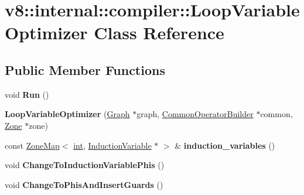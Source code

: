 \hypertarget{classv8_1_1internal_1_1compiler_1_1LoopVariableOptimizer}{}\section{v8\+:\+:internal\+:\+:compiler\+:\+:Loop\+Variable\+Optimizer Class Reference}
\label{classv8_1_1internal_1_1compiler_1_1LoopVariableOptimizer}
\subsection*{Public Member Functions}
\begin{DoxyCompactItemize}
\item 
\mbox{\label{classv8_1_1internal_1_1compiler_1_1LoopVariableOptimizer_acea262e65984d9608955c99a16fed707}} 
void {\bfseries Run} ()
\item 
\mbox{\label{classv8_1_1internal_1_1compiler_1_1LoopVariableOptimizer_a4ff668f7cdafcc1519b5a890decd791b}} 
{\bfseries Loop\+Variable\+Optimizer} (\mbox{\hyperlink{classv8_1_1internal_1_1compiler_1_1Graph}{Graph}} $\ast$graph, \mbox{\hyperlink{classv8_1_1internal_1_1compiler_1_1CommonOperatorBuilder}{Common\+Operator\+Builder}} $\ast$common, \mbox{\hyperlink{classv8_1_1internal_1_1Zone}{Zone}} $\ast$zone)
\item 
\mbox{\label{classv8_1_1internal_1_1compiler_1_1LoopVariableOptimizer_acb45aab0b03e0dea01a4cd1ec8d158c8}} 
const \mbox{\hyperlink{classv8_1_1internal_1_1ZoneMap}{Zone\+Map}}$<$ \mbox{\hyperlink{classint}{int}}, \mbox{\hyperlink{classv8_1_1internal_1_1compiler_1_1InductionVariable}{Induction\+Variable}} $\ast$ $>$ \& {\bfseries induction\+\_\+variables} ()
\item 
\mbox{\label{classv8_1_1internal_1_1compiler_1_1LoopVariableOptimizer_a37c24c084c6d59437f37553e858d5a13}} 
void {\bfseries Change\+To\+Induction\+Variable\+Phis} ()
\item 
\mbox{\label{classv8_1_1internal_1_1compiler_1_1LoopVariableOptimizer_a525aa57dcd93d4b35b6efbafebd319bb}} 
void {\bfseries Change\+To\+Phis\+And\+Insert\+Guards} ()
\end{DoxyCompactItemize}


